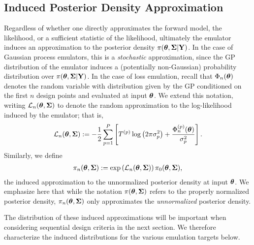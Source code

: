 \documentclass[12pt]{article}
\begin{document}
\subsection{Induced Posterior Density Approximation}
Regardless of whether one directly approximates the forward model, the likelihood, or a sufficient statistic of the likelihood, ultimately the emulator induces an approximation to the posterior 
density $\pi(\boldsymbol{\theta}, \boldsymbol{\Sigma}|\mathbf{Y})$. In the case of Gaussian process emulators, this is a \textit{stochastic} approximation, since the GP distribution of the emulator induces 
a (potentially non-Gaussian) probability distribution over $\pi(\boldsymbol{\theta}, \boldsymbol{\Sigma}|\mathbf{Y})$. In the case of loss emulation, recall that $\Phi_{n}(\boldsymbol{\theta})$ denotes the random 
variable with distribution given by the GP conditioned on the first $n$ design points and evaluated at input $\boldsymbol{\theta}$. We extend this notation, writing $\mathcal{L}_{n}(\boldsymbol{\theta}, \boldsymbol{\Sigma})$ 
to denote the random approximation to the log-likelihood induced by the emulator; that is, 
\begin{align}
\mathcal{L}_{n}(\boldsymbol{\theta}, \boldsymbol{\Sigma}) := -\frac{1}{2} \sum_{p = 1}^{P} \left[{T}^{(p)} \log\left(2\pi \sigma_{p}^2 \right) + \frac{\Phi_{n}^{(p)}(\boldsymbol{\theta})}{\sigma_{p}^2} \right].
\end{align}
Similarly, we define 
\begin{align*}
\pi_{n}(\boldsymbol{\theta}, \boldsymbol{\Sigma}) := \exp\left(\mathcal{L}_{n}(\boldsymbol{\theta}, \boldsymbol{\Sigma})\right) \pi_0(\boldsymbol{\theta}, \boldsymbol{\Sigma}),
\end{align*}
the induced approximation to the unnormalized posterior density at input $\boldsymbol{\theta}$. We emphasize here that while the notation $\pi(\boldsymbol{\theta}, \boldsymbol{\Sigma})$ refers to the 
properly normalized posterior density, $\pi_{n}(\boldsymbol{\theta}, \boldsymbol{\Sigma})$ only approximates the \textit{unnormalized} posterior density. 

The distribution of 
these induced approximations will be important when considering sequential design criteria in the next section. We therefore characterize the induced distributions for the various emulation 
targets below. 
\end{document}
